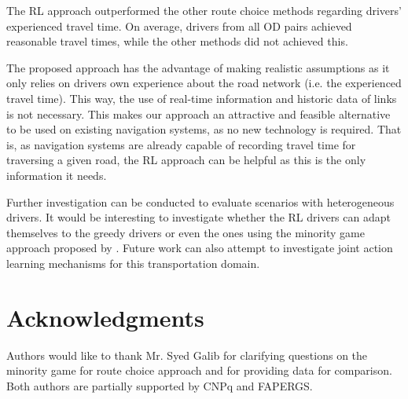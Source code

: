 \documentclass{RITA}
\begin{document}
The RL approach outperformed the other route choice methods regarding drivers' experienced travel time. On average, drivers from all OD pairs achieved reasonable travel times, while the other methods did not achieved this.


The proposed approach has the advantage of making realistic assumptions as it only relies on drivers own experience about the road network (i.e. the experienced travel time). This way, the use of real-time information and historic data of links is not necessary. This makes our approach an attractive and feasible alternative to be used on existing navigation systems, as no new technology is required. That is, as navigation systems are already capable of recording travel time for traversing a given road, the RL approach can be helpful as this is the only information it needs.

Further investigation can be conducted to evaluate scenarios with heterogeneous drivers. It would be interesting to investigate whether the RL drivers can adapt themselves to the greedy drivers or even the ones using the minority game approach proposed by \cite{Galib&Moser2011}. Future work can also attempt to investigate joint action learning mechanisms for this transportation domain.

\section{Acknowledgments}

Authors would like to thank Mr. Syed Galib for clarifying questions on the minority game for route choice approach and for providing data for comparison. Both authors are partially supported by CNPq and FAPERGS. %


 
\end{document}
